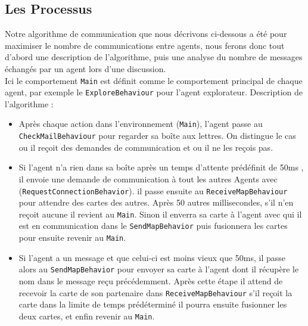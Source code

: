 \documentclass[10pt]{article}
\newcommand\tab[1][0.65cm]{\hspace*{#1}}
\begin{document}
\subsection{Les Processus}
Notre algorithme de communication que nous décrivons ci-dessous a été pour maximiser le nombre de communications entre agents, nous ferons donc tout d'abord une description de l'algorithme, puis une analyse du nombre de messages échangés par un agent lors d'une discussion.\\
\linebreak   
\tab Ici le comportement \texttt{Main} est définit comme le comportement principal de chaque agent, par exemple le \texttt{ExploreBehaviour} pour l'agent explorateur. 
Description de l'algorithme :
\begin{itemize}
\item Après chaque action dans l'environnement (\texttt{Main}), l'agent passe au \texttt{CheckMailBehaviour} pour regarder sa boîte aux lettres. On distingue le cas ou il reçoit des demandes de communication  et ou il ne les reçois pas.

\item Si l'agent n'a rien dans sa boîte après un temps d'attente prédéfinit de 50ms , il envoie une demande de communication à tout les autres Agents avec (\texttt{RequestConnectionBehavior}). il passe ensuite au \texttt{ReceiveMapBehaviour} pour attendre des cartes des autres. Après 50 autres millisecondes, s'il n'en reçoit aucune il revient au \texttt{Main}. Sinon il enverra sa carte à l'agent avec qui il est en communication dans le \texttt{SendMapBehavior} puis fusionnera les cartes pour ensuite revenir au \texttt{Main}.

\item Si l'agent a un message et que celui-ci est moins vieux que 50ms, il passe alors au \texttt{SendMapBehavior} pour envoyer sa carte à l'agent dont il récupère le nom dans le message reçu précédemment. Après cette étape il attend de recevoir la carte de son partenaire dans \texttt{ReceiveMapBehaviour} s'il reçoit la carte dans la limite de temps prédéterminé il pourra ensuite fusionner les deux cartes, et enfin revenir au \texttt{Main}.\\

\end{itemize}
\end{document}
